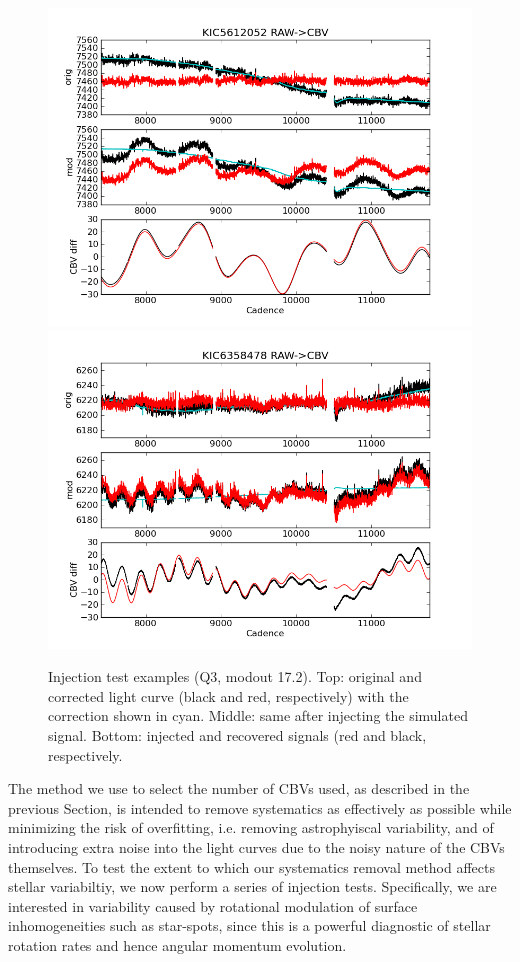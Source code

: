 \documentclass[useAMS,usenatbib]{mn2e}
\begin{document}
\begin{figure}
  \centering
  \includegraphics[width=0.48\linewidth]{inject_ex1.png} \hfill
  \includegraphics[width=0.48\linewidth]{inject_ex2.png}
  \caption{Injection test examples (Q3, modout 17.2). Top: original
    and corrected light curve (black and red, respectively) with the correction
    shown in cyan. Middle: same after injecting the simulated
    signal. Bottom: injected and recovered signals (red and black, respectively.}
  \label{fig:inject_ex}
\end{figure}

The method we use to select the number of CBVs used, as described in
the previous Section, is intended to remove systematics as effectively
as possible while minimizing the risk of
overfitting, i.e. removing astrophyiscal variability, and of
introducing extra noise into the light curves due to the noisy nature
of the CBVs themselves. To test the extent to which our systematics
removal method affects stellar variabiltiy, we now perform a series of
injection tests. Specifically, we are interested in variability caused
by rotational modulation of surface inhomogeneities such as
star-spots, since this is a powerful diagnostic of stellar rotation
rates and hence angular momentum evolution.
\end{document}
